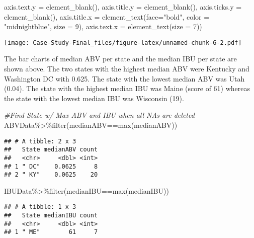 \documentclass[
]{article}
\newenvironment{Shaded}{\begin{snugshade}}{\end{snugshade}}
\newcommand{\AttributeTok}[1]{\textcolor[rgb]{0.77,0.63,0.00}{#1}}
\newcommand{\CommentTok}[1]{\textcolor[rgb]{0.56,0.35,0.01}{\textit{#1}}}
\newcommand{\DecValTok}[1]{\textcolor[rgb]{0.00,0.00,0.81}{#1}}
\newcommand{\FunctionTok}[1]{\textcolor[rgb]{0.00,0.00,0.00}{#1}}
\newcommand{\NormalTok}[1]{#1}
\newcommand{\SpecialCharTok}[1]{\textcolor[rgb]{0.00,0.00,0.00}{#1}}
\newcommand{\StringTok}[1]{\textcolor[rgb]{0.31,0.60,0.02}{#1}}
\begin{document}
\begin{Shaded}
\begin{Highlighting}[]
        \AttributeTok{axis.text.y =} \FunctionTok{element\_blank}\NormalTok{(),}
        \AttributeTok{axis.title.y =} \FunctionTok{element\_blank}\NormalTok{(),}
        \AttributeTok{axis.ticks.y =} \FunctionTok{element\_blank}\NormalTok{(),}
        \AttributeTok{axis.title.x =} \FunctionTok{element\_text}\NormalTok{(}\AttributeTok{face=}\StringTok{"bold"}\NormalTok{, }\AttributeTok{color =} \StringTok{"midnightblue"}\NormalTok{, }\AttributeTok{size =} \DecValTok{9}\NormalTok{),}
        \AttributeTok{axis.text.x =} \FunctionTok{element\_text}\NormalTok{(}\AttributeTok{size =} \DecValTok{7}\NormalTok{))}
\end{Highlighting}
\end{Shaded}

\texttt{[image: Case-Study-Final\_files/figure-latex/unnamed-chunk-6-2.pdf]}

The bar charts of median ABV per state and the median IBU per state are
shown above. The two states with the highest median ABV were Kentucky
and Washington DC with 0.625. The state with the lowest median ABV was
Utah (0.04). The state with the highest median IBU was Maine (score of
61) whereas the state with the lowest median IBU was Wisconsin (19).

\begin{Shaded}
\begin{Highlighting}[]
\CommentTok{\#Find State w/ Max ABV and IBU when all NAs are deleted}
\NormalTok{ABVData}\SpecialCharTok{\%\textgreater{}\%}\FunctionTok{filter}\NormalTok{(medianABV}\SpecialCharTok{==}\FunctionTok{max}\NormalTok{(medianABV))}
\end{Highlighting}
\end{Shaded}

\begin{verbatim}
## # A tibble: 2 x 3
##   State medianABV count
##   <chr>     <dbl> <int>
## 1 " DC"    0.0625     8
## 2 " KY"    0.0625    20
\end{verbatim}

\begin{Shaded}
\begin{Highlighting}[]
\NormalTok{IBUData}\SpecialCharTok{\%\textgreater{}\%}\FunctionTok{filter}\NormalTok{(medianIBU}\SpecialCharTok{==}\FunctionTok{max}\NormalTok{(medianIBU))}
\end{Highlighting}
\end{Shaded}

\begin{verbatim}
## # A tibble: 1 x 3
##   State medianIBU count
##   <chr>     <dbl> <int>
## 1 " ME"        61     7
\end{verbatim}
\end{document}

